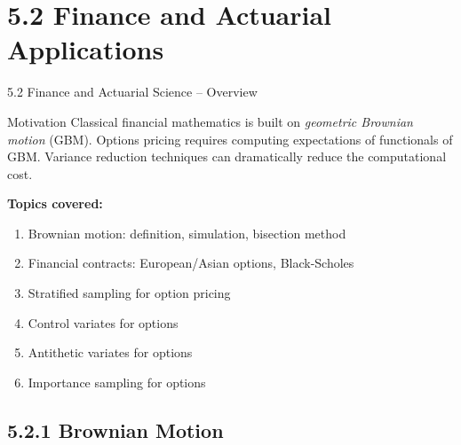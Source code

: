 \documentclass[aspectratio=169,10pt]{beamer}
\begin{document}
\section{5.2 Finance and Actuarial Applications}

\begin{frame}{5.2 Finance and Actuarial Science -- Overview}

  \begin{block}{Motivation}
    Classical financial mathematics is built on \emph{geometric Brownian motion}
    (GBM). Options pricing requires computing expectations of functionals of GBM.
    Variance reduction techniques can dramatically reduce the computational cost.
  \end{block}

  \medskip
  \textbf{Topics covered:}
  \begin{enumerate}
    \item Brownian motion: definition, simulation, bisection method
    \item Financial contracts: European/Asian options, Black-Scholes
    \item Stratified sampling for option pricing
    \item Control variates for options
    \item Antithetic variates for options
    \item Importance sampling for options
  \end{enumerate}

\end{frame}

\subsection{5.2.1 Brownian Motion}
\end{document}
